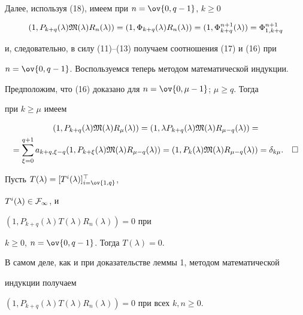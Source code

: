  


Далее, используя (18), имеем при $n=\ov{0,q-1}$, $k\ge 0$ 


$$ 


(1,P_{k+q}(\lambda)\frak M(\lambda)R_n(\lambda))= 


(1,\Phi_{k+q}(\lambda)R_n(\lambda))= 


(1,\Phi^{n+1}_{k+q}(\lambda))=\Phi^{n+1}_{1,k+q} 


$$ 


и, следовательно, в силу (11)--(13) получаем соотношения (17) и (16) при 


$n=\ov{0,q-1}$. Воспользуемся теперь методом математической индукции. 


Предположим, что (16) доказано для $n=\ov{0,\mu-1}$; $\mu\ge q$. Тогда 


при $k\ge\mu$ имеем 


\begin{multline*} 


(1,P_{k+q}(\lambda)\frak M(\lambda)R_\mu(\lambda))= 


(1,\lambda P_{k+q}(\lambda)\frak M(\lambda)R_{\mu-q}(\lambda))= \\ 


=\sum^{q+1}_{\xi=0}a_{k+q,\xi-q}(1,P_{k+\xi}(\lambda) 


\frak M(\lambda)R_{\mu-q}(\lambda))= 


(1,P_k(\lambda)\frak M(\lambda)R_{\mu-q}(\lambda))= 


\delta_{k\mu}.\quad\square 


\end{multline*} 


 


\begin{lem} 


Пусть $T(\lambda)=[T^i(\lambda)]^\top_{i=\ov{1,q}}$, 


$T^i(\lambda)\in\cal F_1$, и


$(1,P_{k+q}(\lambda)T(\lambda)R_n(\lambda))=0$ при 


$k\ge 0$, $n=\ov{0,q-1}$. Тогда $T(\lambda)=0$. 


\end{lem} 


 


В самом деле, как и при доказательстве леммы 1, методом математической 


индукции получаем 


$(1,P_{k+q}(\lambda)T(\lambda)R_n(\lambda))=0$ при всех $k,n\ge 0$. 


